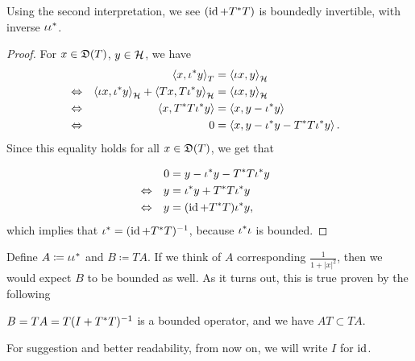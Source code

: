 \begin{prop}
 Using the second interpretation, we see $(\operatorname{id} + T ^{*} T)$ is boundedly invertible, with inverse $\iota \iota ^{*}$.
\end{prop}
\begin{proof}
  For $x \in \mathfrak{D}(T)$, $y \in \mathcal{H}$,  we have
  \begin{align*}
  &\quad & \left\langle x, \iota ^{*} y \right\rangle_T &= \left\langle \iota x, y \right\rangle_{\mathcal{H}}  &\\
  &\Leftrightarrow & \left\langle \iota x ,\iota ^{*} y \right\rangle_{\mathcal{H}} + \left\langle Tx, T\iota ^{*} y \right\rangle_{\mathcal{H}} &= \left\langle \iota x, y \right\rangle_{\mathcal{H}}  &\\
  &\Leftrightarrow & \left\langle x, T ^* T \iota ^{*} y \right\rangle &= \left\langle x, y - \iota ^{*} y \right\rangle &\\
  &\Leftrightarrow & 0 &= \left\langle x, y - \iota ^{*} y - T ^* T \iota ^{*} y \right\rangle. & 
  \end{align*}
  Since this equality holds for all $x \in \mathfrak{D}(T)$, we get that 

  \begin{align*}
  & \quad & 0&= y - \iota ^{*} y - T ^* T \iota ^{*} y  & \\
  & \Leftrightarrow  & y &= \iota ^{*} y + T ^{*} T \iota ^{*} y& \\
  & \Leftrightarrow & y &= (\operatorname{id} + T ^{*} T) \iota ^{*} y, &
  \end{align*}
  which implies that $  \iota ^{*} = ( \operatorname{id} + T ^{*} T) ^{-1}$, because $\iota ^{*} \iota$ is bounded.
\end{proof}

Define $A \coloneqq \iota \iota ^{*}$ and $B \coloneqq TA$. If we think of $A$ corresponding $\frac{1}{1 + |x|^2}$, then we would expect $B$ to be bounded as well. As it turns out, this is true proven by the following

\begin{lem}
 $B = TA = T(I + T ^{*} T)^{-1}$ is a bounded operator, and we have $AT \subset TA$.
\end{lem}

\begin{rem}
 For suggestion and better readability, from now on, we will write $I$ for $\operatorname{id}$.
\end{rem}


